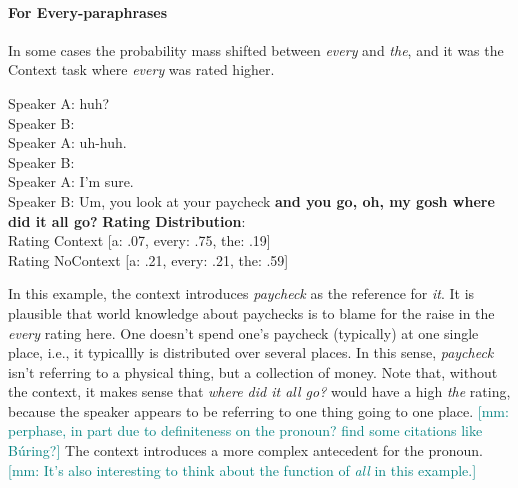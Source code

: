\documentclass[12pt,letterpaper,table,svgnames,dvipsnames]{article}
\newcommand{\mm}[1]{\textcolor{teal}{[mm: #1]}}
\begin{document}
        


\paragraph{For Every-paraphrases}

In some cases the probability mass shifted between \emph{every} and \emph{the}, and it was the Context task where \emph{every} was rated higher.
\begin{exe}
\ex {}
    \begin{xlist}
    \ex {}
    Speaker A: huh?\\
    Speaker B: \\
    Speaker A: uh-huh.\\
    Speaker B: \\
    Speaker A: I'm sure.\\
    Speaker B: Um, you look at your paycheck \textbf{and you go, oh, my gosh where did it all go?}
    \ex \textbf{Rating Distribution}:\\
    Rating Context [a: .07, every: .75, the: .19]\\
    Rating NoContext [a: .21, every: .21, the: .59]
    \end{xlist}
\end{exe}

In this example, the context introduces \emph{paycheck} as the reference for \emph{it}. It is plausible that world knowledge about paychecks is to blame for the raise in the \emph{every} rating here. One doesn't spend one's paycheck (typically) at one single place, i.e., it typicallly is distributed over several places. In this sense, \emph{paycheck} isn't referring to a physical thing, but a collection of money. Note that, without the context, it makes sense that \emph{where did it all go?} would have a high \emph{the} rating, because the speaker appears to be referring to one thing going to one place. \mm{perphase, in part due to definiteness on the pronoun? find some citations like B\'uring?} The context introduces a more complex antecedent for the pronoun. \mm{It's also interesting to think about the function of \emph{all} in this example.}
\end{document}
